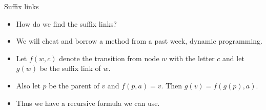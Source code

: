 \documentclass{beamer}
\begin{document}
	\begin{frame}[plain]{Suffix links}
		\begin{itemize}
			\item How do we find the suffix links?
			\item We will cheat and borrow a method from a past week, dynamic programming.
			\item Let $f(w, c)$ denote the transition from node $w$ with the letter $c$ and let $g(w)$ be the suffix link of $w$.
			\item Also let $p$ be the parent of $v$ and $f(p, a) = v$. Then $g(v) = f(g(p), a)$.
			\item Thus we have a recursive formula we can use.
		\end{itemize}
	\end{frame}
	
\end{document}
